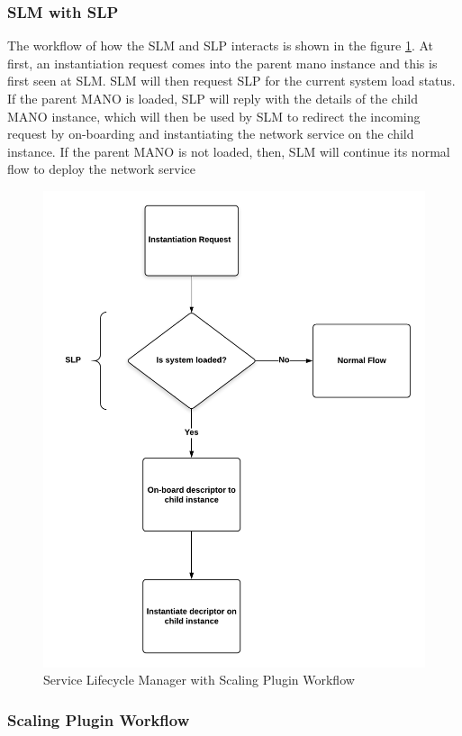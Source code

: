 \subsubsection{SLM with SLP}

The workflow of how the SLM and SLP interacts is shown in the figure \ref{fig:slpslmworkflow}. At first, an instantiation request comes into the parent mano instance and this is first seen at SLM. SLM will then request SLP for the current system load status. If the parent MANO is loaded, SLP will reply with the details of the child MANO instance, which will then be used by SLM to redirect the incoming request by on-boarding and instantiating the network service on the child instance. If the parent MANO is not loaded, then, SLM will continue its normal flow to deploy the network service

\begin{figure}[h]
	\centering
	\includegraphics[width=0.8\linewidth]{figures/SLPSLMWorkflow}
	\caption{Service Lifecycle Manager with Scaling Plugin Workflow}
	\label{fig:slpslmworkflow}
\end{figure}

\subsubsection{Scaling Plugin Workflow}

